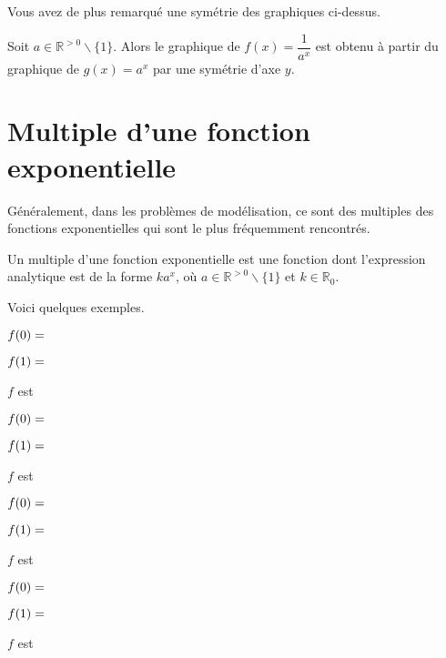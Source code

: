 \documentclass[a4paper,12pt,singlepage]{report}
\newcommand{\IR}{\mathbb{R}}
\begin{document}
Vous avez de plus remarqué une symétrie des graphiques ci-dessus.
\begin{propriete}
Soit \(a\in\IR^{>0}\backslash\{1\}\). Alors le graphique de
\(f(x)=\dfrac{1}{a^x}\) est obtenu à partir du graphique de \(g(x)=a^x\)
par une symétrie d'axe \(y\).
\end{propriete}
\section{Multiple d'une fonction exponentielle}
\label{sec:orgcaebea3}
Généralement, dans les problèmes de modélisation, ce sont des multiples des
fonctions exponentielles qui sont le plus fréquemment rencontrés.
\begin{definition}
Un multiple d'une fonction exponentielle est une fonction dont
l'expression analytique est de la forme \(ka^x\), où
\(a\in\IR^{>0}\backslash\{1\}\) et \(k\in\IR_0\).
\end{definition}
Voici quelques exemples.
\vspace{1cm}


\vspace{1cm}

\par \setlength{\columnseprule}{0 pt}
          \begin{minipage}[t]{\linewidth}
          \begin{multicols}{2}
\(f(0)=\dotfill\)

\(f(1)=\dotfill\)

\(f\) est \dotfill

\(f(0)=\dotfill\)

\(f(1)=\dotfill\)

\(f\) est \dotfill


\end{multicols}\end{minipage}

\vspace{1cm}
\begin{center}

\end{center}
\vspace{1cm}

\par \setlength{\columnseprule}{0 pt}
          \begin{minipage}[t]{\linewidth}
          \begin{multicols}{2}
\(f(0)=\dotfill\)

\(f(1)=\dotfill\)

\(f\) est \dotfill

\(f(0)=\dotfill\)

\(f(1)=\dotfill\)

\(f\) est \dotfill


\end{multicols}\end{minipage}
\end{document}

